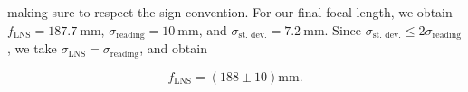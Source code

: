making sure to respect the sign convention. For our final focal length, we obtain $f_\text{LNS} = \qty{187.7}{\milli\metre}$, $\sigma_\text{reading} = \qty{10}{\milli\metre}$, and $\sigma_\text{st. dev.} = \qty{7.2}{\milli\metre}$. Since $\sigma_\text{st. dev.} \leq 2\sigma_\text{reading}$, we take $\sigma_\text{LNS} = \sigma_\text{reading}$, and obtain

\[f_\text{LNS} = (188 \pm 10) \unit{\milli\metre}.\]